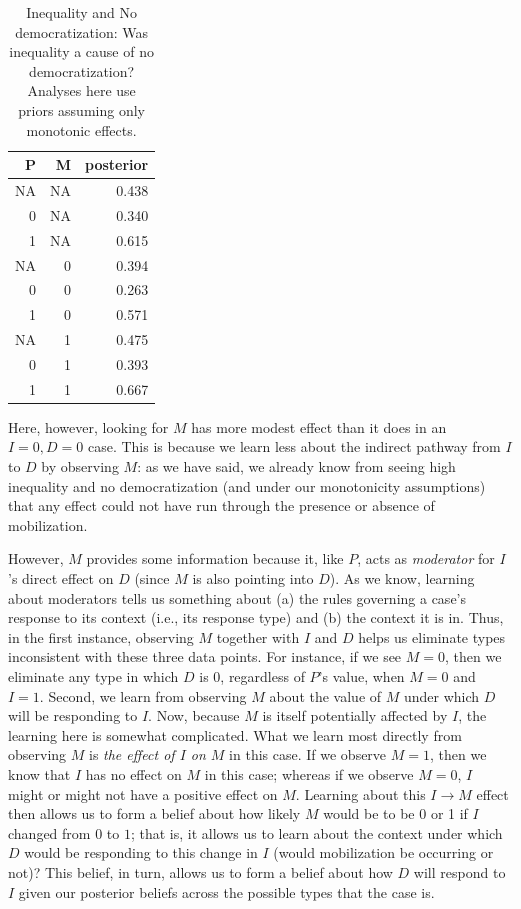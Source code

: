 \documentclass[12pt,]{book}
\begin{document}
\begin{table}[t]

\caption{\label{tab:Tapp2}Inequality and No democratization: Was inequality a cause of no democratization? Analyses here use priors assuming only monotonic effects.}
\centering
\begin{tabular}{r|r|r}
\hline
P & M & posterior\\
\hline
NA & NA & 0.438\\
\hline
0 & NA & 0.340\\
\hline
1 & NA & 0.615\\
\hline
NA & 0 & 0.394\\
\hline
0 & 0 & 0.263\\
\hline
1 & 0 & 0.571\\
\hline
NA & 1 & 0.475\\
\hline
0 & 1 & 0.393\\
\hline
1 & 1 & 0.667\\
\hline
\end{tabular}
\end{table}

Here, however, looking for \(M\) has more modest effect than it does in an \(I=0, D=0\) case. This is because we learn less about the indirect pathway from \(I\) to \(D\) by observing \(M\): as we have said, we already know from seeing high inequality and no democratization (and under our monotonicity assumptions) that any effect could not have run through the presence or absence of mobilization.

However, \(M\) provides some information because it, like \(P\), acts as \emph{moderator} for \(I\)'s direct effect on \(D\) (since \(M\) is also pointing into \(D\)). As we know, learning about moderators tells us something about (a) the rules governing a case's response to its context (i.e., its response type) and (b) the context it is in. Thus, in the first instance, observing \(M\) together with \(I\) and \(D\) helps us eliminate types inconsistent with these three data points. For instance, if we see \(M=0\), then we eliminate any type in which \(D\) is 0, regardless of \(P\)'s value, when \(M=0\) and \(I=1\). Second, we learn from observing \(M\) about the value of \(M\) under which \(D\) will be responding to \(I\). Now, because \(M\) is itself potentially affected by \(I\), the learning here is somewhat complicated. What we learn most directly from observing \(M\) is \emph{the effect of \(I\) on \(M\)} in this case. If we observe \(M=1\), then we know that \(I\) has no effect on \(M\) in this case; whereas if we observe \(M=0\), \(I\) might or might not have a positive effect on \(M\). Learning about this \(I \rightarrow M\) effect then allows us to form a belief about how likely \(M\) would be to be 0 or 1 if \(I\) changed from \(0\) to \(1\); that is, it allows us to learn about the context under which \(D\) would be responding to this change in \(I\) (would mobilization be occurring or not)? This belief, in turn, allows us to form a belief about how \(D\) will respond to \(I\) given our posterior beliefs across the possible types that the case is.
\end{document}
